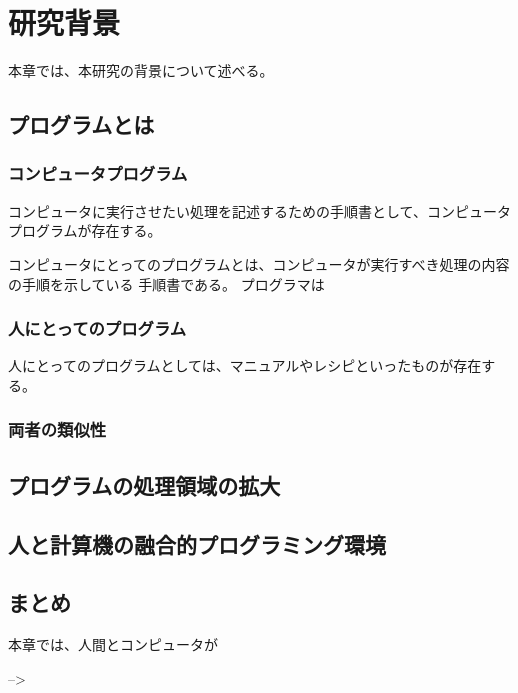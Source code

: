 \chapter{研究背景}
\label{chap:background}

本章では、本研究の背景について述べる。

\section{プログラムとは}\label{ux30d7ux30edux30b0ux30e9ux30e0ux3068ux306f}

\subsection{コンピュータプログラム}\label{ux30b3ux30f3ux30d4ux30e5ux30fcux30bfux30d7ux30edux30b0ux30e9ux30e0}

コンピュータに実行させたい処理を記述するための手順書として、コンピュータプログラムが存在する。

コンピュータにとってのプログラムとは、コンピュータが実行すべき処理の内容の手順を示している
手順書である。 プログラマは

\subsection{人にとってのプログラム}\label{ux4ebaux306bux3068ux3063ux3066ux306eux30d7ux30edux30b0ux30e9ux30e0}

人にとってのプログラムとしては、マニュアルやレシピといったものが存在する。

\subsection{両者の類似性}\label{ux4e21ux8005ux306eux985eux4f3cux6027}

\section{プログラムの処理領域の拡大}\label{ux30d7ux30edux30b0ux30e9ux30e0ux306eux51e6ux7406ux9818ux57dfux306eux62e1ux5927}

\section{人と計算機の融合的プログラミング環境}\label{ux4ebaux3068ux8a08ux7b97ux6a5fux306eux878dux5408ux7684ux30d7ux30edux30b0ux30e9ux30dfux30f3ux30b0ux74b0ux5883}

\section{まとめ}\label{ux307eux3068ux3081}

本章では、人間とコンピュータが

--\textgreater{}
